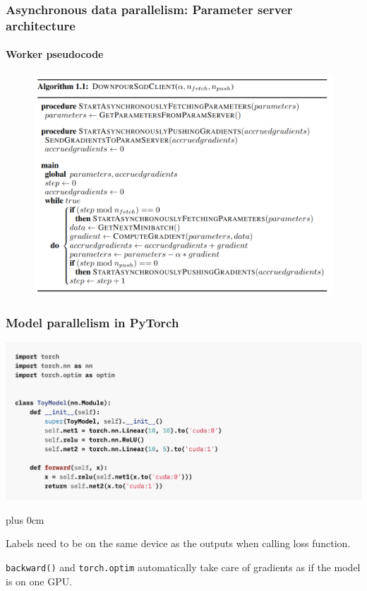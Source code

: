 \documentclass[11pt]{beamer}
\renewcommand{\raggedright}{\leftskip=0pt \rightskip=0pt plus 0cm}
\let\olditemize=\itemize
\renewenvironment{itemize}{\olditemize\raggedright}{\endlist}
\begin{document}
\begin{frame}
\frametitle{Asynchronous data parallelism: Parameter server architecture}
\framesubtitle{Worker pseudocode}
\begin{figure}
\includegraphics[scale=.25]{images/model/client-code-param-server.png}
\end{figure}
\end{frame}
\begin{frame}
\frametitle{Model parallelism in PyTorch}
\begin{center}
\includegraphics[scale=.3]{images/code/parallelize-model.png}
\end{center}
\begin{itemize}
	\item Labels need to be on the same device as the outputs when calling loss function.
	\item \texttt{backward()} and \texttt{torch.optim} automatically take care of gradients as if the model is on one GPU.
\end{itemize}
\end{frame}
\end{document}
